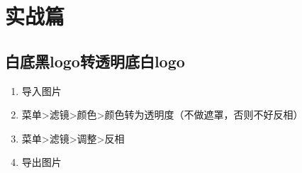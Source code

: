 \section{实战篇}

\subsection{白底黑logo转透明底白logo}
\begin{enumerate}
    \item 导入图片
    \item 菜单>滤镜>颜色>颜色转为透明度（不做遮罩，否则不好反相）
    \item 菜单>滤镜>调整>反相
    \item 导出图片
\end{enumerate}
